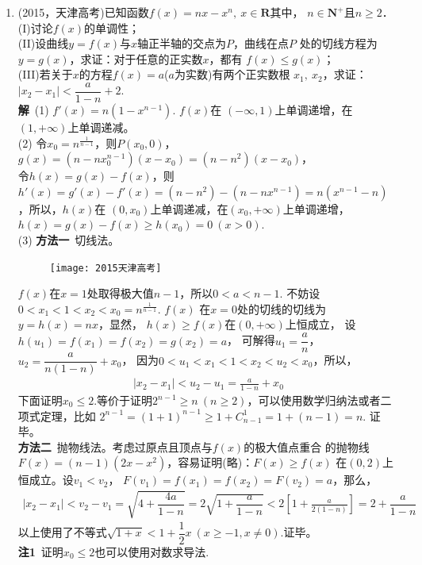 \begin{enumerate}[label={【\textbf{例\thechapter.\arabic*}】},
 leftmargin=\inteval{\myenumleftmargin}pt,
 itemsep=\inteval{\myenumitempsep}pt,
 itemindent=\inteval{\myenumitemindent}pt]
\item (2015，天津高考)已知函数$ f(x)=nx-x^n,\ x\in \textbf{R} $其中，
$ n\in \textbf{N}^+ $且$ n\geq 2 $．\\
(I)讨论$ f(x) $的单调性；\\
(II)设曲线$ y=f(x) $与$ x $轴正半轴的交点为$ P $，曲线在点$ P $
处的切线方程为$ y=g(x) $，求证：对于任意的正实数$ x $，都有
$ f(x)\leq g(x) $；\\
(III)若关于$ x $的方程$ f(x)=a $($ a $为实数)有两个正实数根
$ x_1,\ x_2 $，求证：$ |x_2-x_1|<\dfrac{a}{1-n}+2 $. \\
\textbf{解}\ (1) $ f'(x)=n(1-x^{n-1}) $. $ f(x) $在
$ (-\infty,1) $上单调递增，在$ (1,+\infty) $上单调递减。\\
(2) 令$ x_0=n^{\frac{1}{n-1}} $，则$ P(x_0,0) $，
$ g(x)=(n-nx_0^{n-1})(x-x_0)=(n-n^2)(x-x_0) $，\\
令$ h(x)=g(x)-f(x) $，则$ h'(x)=g'(x)-f'(x)=(n-n^2)-
(n-nx^{n-1})=n(x^{n-1}-n) $，所以，$ h(x) $在
$ (0,x_0) $上单调递减，在$ (x_0,+\infty) $上单调递增，
$ h(x)=g(x)-f(x)\geq h(x_0)=0\ (x>0) $. \\
(3) \textbf{方法一}\ 切线法。
\begin{figure}[H]
    \centering
    \texttt{[image: 2015天津高考]}
\end{figure}
$ f(x) $在$ x=1 $处取得极大值$ n-1 $，所以$ 0<a<n-1 $.
不妨设$ 0<x_1<1<x_2<x_0=n^{\frac{1}{n-1}} $. $ f(x) $
在$ x=0 $处的切线的切线为$ y=h(x)=nx $，显然，
$ h(x)\geq f(x) $在$ (0,+\infty) $上恒成立，
设$ h(u_1)=f(x_1)=f(x_2)=g(x_2)=a $，
可解得$ u_1=\dfrac{a}{n} $，$ u_2=\dfrac{a}{n(1-n)}+x_0 $，
因为$ 0<u_1<x_1<1<x_2<u_2<x_0 $，所以，
\begin{gather*}
    |x_2-x_1|<u_2-u_1=\frac{a}{1-n}+x_0
\end{gather*}
下面证明$ x_0\leq 2 $.等价于证明$ 2^{n-1}\geq n\ 
(n\geq 2) $，可以使用数学归纳法或者二项式定理，比如
$ 2^{n-1}=(1+1)^{n-1}\geq 1+C_{n-1}^1=1+(n-1)=n $. 证毕。\\
\textbf{方法二}\ 抛物线法。考虑过原点且顶点与$ f(x) $的极大值点重合
的抛物线$ F(x)=(n-1)(2x-x^2) $，容易证明(略)：$ F(x)\geq f(x) $
在$ (0,2) $上恒成立。设$ v_1<v_2 $，
$ F(v_1)=f(x_1)=f(x_2)=F(v_2)=a $，那么，
\begin{gather*}
    |x_2-x_1|<v_2-v_1=\sqrt{4+\dfrac{4a}{1-n}}=
    2\sqrt{1+\dfrac{a}{1-n}}<2\left[1+\frac{a}{2(1-n)}\right]
    =2+\dfrac{a}{1-n}
\end{gather*}
以上使用了不等式$ \sqrt{1+x}<1+\dfrac{1}{2}x\ (x\geq -1,x\neq 0) $.证毕。\\
\textbf{注1}\ 证明$ x_0\leq 2 $也可以使用对数求导法. 

\end{enumerate}
